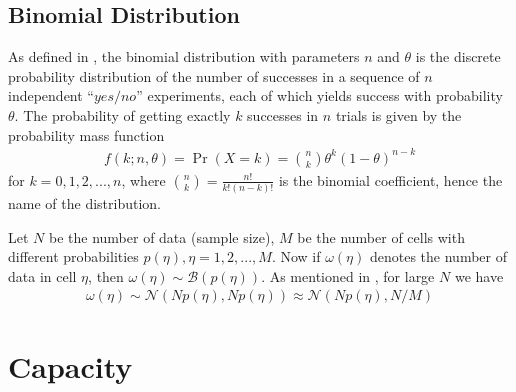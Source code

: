 \subsection{Binomial Distribution}
As defined in \cite{binomial_distribution_defn}, the binomial distribution with parameters $n$ and $\theta$ is the discrete probability distribution of the number of successes in a sequence of $n$ independent ``$yes/no$'' experiments, each of which yields success with probability $\theta$. The probability of getting exactly $k$ successes in $n$ trials is given by the probability mass function
\begin{eqnarray}
f(k;n,\theta) = \Pr(X = k) = {n\choose k}\theta^k(1-\theta)^{n-k} \label{eqn:binomail_distribution_pmf}
\end{eqnarray}
for $k = 0, 1, 2, ..., n$, where ${n\choose k}=\frac{n!}{k!(n-k)!}$ is the binomial coefficient, hence the name of the distribution. \par \noindent Let $N$ be the number of data (sample size), $M$ be the number of cells with different probabilities $p(\eta), \eta = 1, 2, . . . , M$. Now if $\omega(\eta)$ denotes the number of data in cell $\eta$, then
$\omega(\eta) \sim \mathcal{B}(p(\eta))$. As mentioned in \cite{distribution_cryptanalysis_kaisa_lecture_ice_break_2013}, for large $N$ we have 
\begin{eqnarray}
\omega(\eta) \sim \mathcal{N}(Np(\eta), Np(\eta)) \approx \mathcal{N}(Np(\eta), N/M) \label{eqn:binomial_distribution_normal_approximation}
\end{eqnarray}

\section{Capacity}
